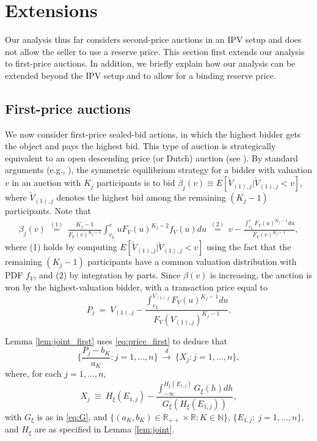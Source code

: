\section{Extensions}\label{sec:extension}

Our analysis thus far considers second-price auctions in an IPV setup and does not allow the seller to use a reserve price. 
This section first extends our analysis to first-price auctions. In addition, we briefly explain how our analysis can be extended beyond the IPV setup and to allow for a binding reserve price. 


\subsection{First-price auctions}\label{sec:fp}

We now consider first-price sealed-bid actions, in which the highest bidder gets the object and pays the highest bid. This type of auction is strategically equivalent to an open descending price (or Dutch) auction (see \citet[page 4]{krishna2009book}). By standard arguments (e.g., \citet[Proposition 2.2]{krishna2009book}), the symmetric equilibrium strategy for a bidder with valuation $v$ in an auction with $K_{j}$ participants is to bid $\beta_{j}(v) \equiv E[\check{V}_{(1),j}|\check{V}_{(1),j}<v]$, where $\check{V}_{(1),j}$ denotes the highest bid among the remaining $(K_{j}-1)$ participants. Note that
\begin{align}
\beta_{j}(v) ~\overset{(1)}{=}~ \frac{K_j-1}{F_V(v)^{K_j-1}}\int_{v_{L}}^{v} {u F_V(u)^{K_j-2}f_V(u)} du~\overset{(2)}{=}~
v - \frac{\int_{v_{L}}^{v} {F_V(u)^{K_j-1}} du}{F_V(v)^{K_j-1}},
\label{eq:bid_first}
\end{align}
where (1) holds by computing $E[\check{V}_{(1),j}|\check{V}_{(1),j}<v]$ using the fact that the remaining $(K_{j}-1)$ participants have a common valuation distribution with PDF $f_V$, and (2) by integration by parts. 
Since $\beta (v)$ is increasing, the auction is won by the highest-valuation bidder, with a transaction price equal to
\begin{equation}
P_{j}~=~V_{(1),j}-\frac{\int_{v_{L}}^{V_{(1),j}}{F_{V}(u)^{K_{j}-1}}du}{F_{V}(V_{(1),j})^{K_{j}-1}}.  \label{eq:price_first}
\end{equation}

Lemma \ref{lem:joint_first} uses \eqref{eq:price_first} to deduce that 
\begin{equation}
\Big\{ \frac{P_{j}-b_{K}}{a_{K}}:j=1,\dots ,n\Big\} ~\overset{d}{\to }~\{ X_{j}:j=1,\dots ,n\} , 
\label{eq:aux_first}
\end{equation}
where, for each $j=1,\dots ,n$, 
\begin{equation}
X_{j}~\equiv ~H_{\xi }( E_{1,j}) -\frac{\int_{-\infty }^{H_{\xi }( E_{1,j}) }G_{\xi }( h) dh}{G_{\xi }( H_{\xi }( E_{1,j}) ) },  \label{eq:aux_RV}
\end{equation}
with $G_{\xi }$ is as in \eqref{eq:G}, and $\{(a_{K},b_{K})\in \mathbb{R}_{++}\times \mathbb{R}:K\in \mathbb{N}\}$, $\{E_{1,j}:~j=1,\dots ,n\}$, and $H_{\xi }$ are as specified in Lemma \ref{lem:joint}.

